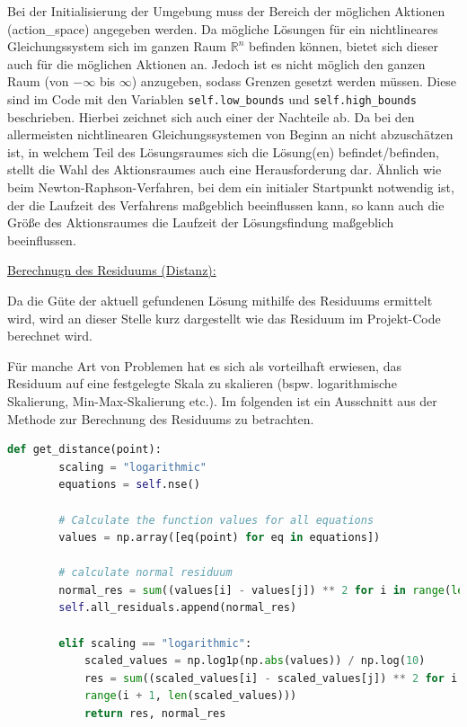 \documentclass{article}
\def\code#1{\texttt{#1}}
\theoremstyle{newline}
\begin{document}
\begin{onehalfspace}
Bei der Initialisierung der Umgebung muss der Bereich der möglichen Aktionen (action\_space) angegeben werden. Da mögliche Lösungen für ein nichtlineares Gleichungssystem sich im ganzen Raum $\mathbb{R}^n$ befinden können, bietet sich dieser auch für die möglichen Aktionen an. Jedoch ist es nicht möglich den ganzen Raum (von $-\infty$ bis $\infty$) anzugeben, sodass Grenzen gesetzt werden müssen. Diese sind im Code mit den Variablen \code{self.low\_bounds} und \code{self.high\_bounds} beschrieben. Hierbei zeichnet sich auch einer der Nachteile ab. Da bei den allermeisten nichtlinearen Gleichungssystemen von Beginn an nicht abzuschätzen ist, in welchem Teil des Lösungsraumes sich die Lösung(en) befindet/befinden, stellt die Wahl des Aktionsraumes auch eine Herausforderung dar. Ähnlich wie beim Newton-Raphson-Verfahren, bei dem ein initialer Startpunkt notwendig ist, der die Laufzeit des Verfahrens maßgeblich beeinflussen kann, so kann auch die Größe des Aktionsraumes die Laufzeit der Lösungsfindung maßgeblich beeinflussen.
\bigskip

\underline{Berechnugn des Residuums (Distanz):}
\smallskip

Da die Güte der aktuell gefundenen Lösung mithilfe des Residuums ermittelt wird, wird an dieser Stelle kurz dargestellt wie das Residuum im Projekt-Code berechnet wird.
\medskip

Für manche Art von Problemen hat es sich als vorteilhaft erwiesen, das Residuum auf eine festgelegte Skala zu skalieren (bspw. logarithmische Skalierung, Min-Max-Skalierung etc.). Im folgenden ist ein Ausschnitt aus der Methode zur Berechnung des Residuums zu betrachten.

\begin{lstlisting}[language=Python, caption={Berechnung des Residuums}, label={lst:python}]
	def get_distance(point):
		scaling = "logarithmic"
		equations = self.nse()
		
		# Calculate the function values for all equations
		values = np.array([eq(point) for eq in equations])
		
		# calculate normal residuum
		normal_res = sum((values[i] - values[j]) ** 2 for i in range(len(values)) for j in range(i + 1, len(values)))
		self.all_residuals.append(normal_res)
		
		elif scaling == "logarithmic":
			scaled_values = np.log1p(np.abs(values)) / np.log(10)
			res = sum((scaled_values[i] - scaled_values[j]) ** 2 for i in range(len(scaled_values)) for j in
			range(i + 1, len(scaled_values)))
			return res, normal_res		
\end{lstlisting}
\bigskip


\end{onehalfspace}
\end{document}
